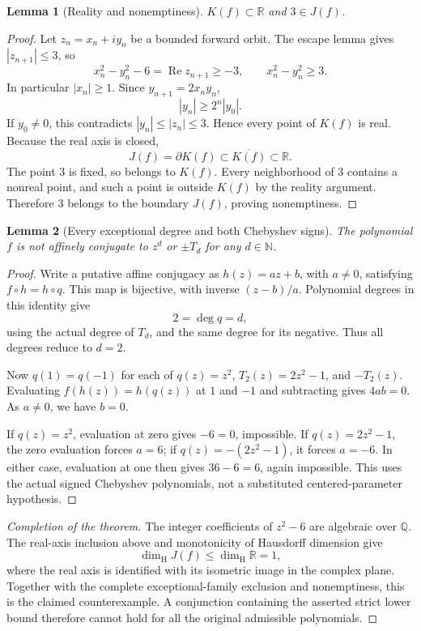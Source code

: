 \documentclass[11pt]{article}
\newtheorem{lemma}{Lemma}
\newcommand{\R}{\mathbb R}
\newcommand{\N}{\mathbb N}
\newcommand{\dimH}{\dim_{\mathrm H}}
\begin{document}
\begin{lemma}[Reality and nonemptiness]
$K(f)\subset\R$ and $3\in J(f)$.
\end{lemma}
\begin{proof}
Let $z_n=x_n+iy_n$ be a bounded forward orbit. The escape lemma gives
$|z_{n+1}|\leq 3$, so
\[
 x_n^2-y_n^2-6=\operatorname{Re} z_{n+1}\geq -3,
 \qquad x_n^2-y_n^2\geq 3.
\]
In particular $|x_n|\geq 1$. Since $y_{n+1}=2x_ny_n$,
\[
 |y_n|\geq 2^n|y_0|.
\]
If $y_0\ne0$, this contradicts $|y_n|\leq |z_n|\leq3$. Hence every point of
$K(f)$ is real. Because the real axis is closed,
\[
 J(f)=\partial K(f)\subset\overline{K(f)}\subset\R.
\]
The point $3$ is fixed, so belongs to $K(f)$. Every neighborhood of $3$ contains
a nonreal point, and such a point is outside $K(f)$ by the reality argument.
Therefore $3$ belongs to the boundary $J(f)$, proving nonemptiness.
\end{proof}

\begin{lemma}[Every exceptional degree and both Chebyshev signs]
The polynomial $f$ is not affinely conjugate to $z^d$ or $\pm T_d$ for any
$d\in\N$.
\end{lemma}
\begin{proof}
Write a putative affine conjugacy as $h(z)=az+b$, with $a\ne0$, satisfying
$f\circ h=h\circ q$. This map is bijective, with inverse $(z-b)/a$.
Polynomial degrees in this identity give
\[
 2=\deg q=d,
\]
using the actual degree of $T_d$, and the same degree for its negative. Thus
all degrees reduce to $d=2$.

Now $q(1)=q(-1)$ for each of $q(z)=z^2$, $T_2(z)=2z^2-1$, and $-T_2(z)$.
Evaluating $f(h(z))=h(q(z))$ at $1$ and $-1$ and subtracting gives $4ab=0$.
As $a\ne0$, we have $b=0$.

If $q(z)=z^2$, evaluation at zero gives $-6=0$, impossible. If
$q(z)=2z^2-1$, the zero evaluation forces $a=6$; if
$q(z)=-(2z^2-1)$, it forces $a=-6$. In either case, evaluation at one then
gives $36-6=6$, again impossible. This uses the actual signed Chebyshev
polynomials, not a substituted centered-parameter hypothesis.
\end{proof}

\begin{proof}[Completion of the theorem]
The integer coefficients of $z^2-6$ are algebraic over $\mathbb Q$.
The real-axis inclusion above and monotonicity of Hausdorff dimension give
\[
 \dimH J(f)\leq\dimH\R=1,
\]
where the real axis is identified with its isometric image in the complex
plane. Together with the complete exceptional-family exclusion and
nonemptiness, this is the claimed counterexample. A conjunction containing
the asserted strict lower bound therefore cannot hold for all the original
admissible polynomials.
\end{proof}
\end{document}
